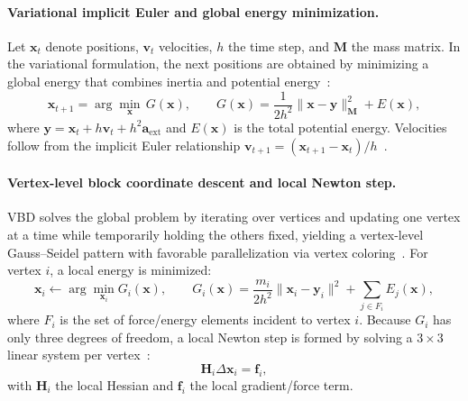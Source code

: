 \paragraph{Variational implicit Euler and global energy minimization.}
Let $\mathbf{x}_t$ denote positions, $\mathbf{v}_t$ velocities, $h$ the time step, and
$\mathbf{M}$ the mass matrix. In the variational formulation, the next positions are obtained
by minimizing a global energy that combines inertia and potential energy~\cite{Chen2024VBD}:
\begin{equation}
\mathbf{x}_{t+1} = \arg\min_{\mathbf{x}}\, G(\mathbf{x}), \qquad
G(\mathbf{x}) = \frac{1}{2h^2}\|\mathbf{x}-\mathbf{y}\|_{\mathbf{M}}^2 + E(\mathbf{x}),
\label{eq:vbd_global_energy}
\end{equation}
where $\mathbf{y}=\mathbf{x}_t+h\mathbf{v}_t+h^2\mathbf{a}_\mathrm{ext}$ and
$E(\mathbf{x})$ is the total potential energy.
Velocities follow from the implicit Euler relationship
$\mathbf{v}_{t+1}=(\mathbf{x}_{t+1}-\mathbf{x}_t)/h$~\cite{Chen2024VBD}.

\paragraph{Vertex-level block coordinate descent and local Newton step.}
\ac{VBD} solves the global problem by iterating over vertices and updating one vertex at a
time while temporarily holding the others fixed, yielding a vertex-level Gauss--Seidel
pattern with favorable parallelization via vertex coloring~\cite{Chen2024VBD}.
For vertex $i$, a local energy is minimized:
\begin{equation}
\mathbf{x}_i \leftarrow \arg\min_{\mathbf{x}_i} G_i(\mathbf{x}), \qquad
G_i(\mathbf{x})=\frac{m_i}{2h^2}\|\mathbf{x}_i-\mathbf{y}_i\|^2+\sum_{j\in F_i}E_j(\mathbf{x}),
\label{eq:vbd_local_energy}
\end{equation}
where $F_i$ is the set of force/energy elements incident to vertex $i$.
Because $G_i$ has only three degrees of freedom, a local Newton step is formed by solving
a $3\times 3$ linear system per vertex~\cite{Chen2024VBD}:
\begin{equation}
\mathbf{H}_i \Delta \mathbf{x}_i = \mathbf{f}_i,
\label{eq:vbd_newton_step}
\end{equation}
with $\mathbf{H}_i$ the local Hessian and $\mathbf{f}_i$ the local gradient/force term.


